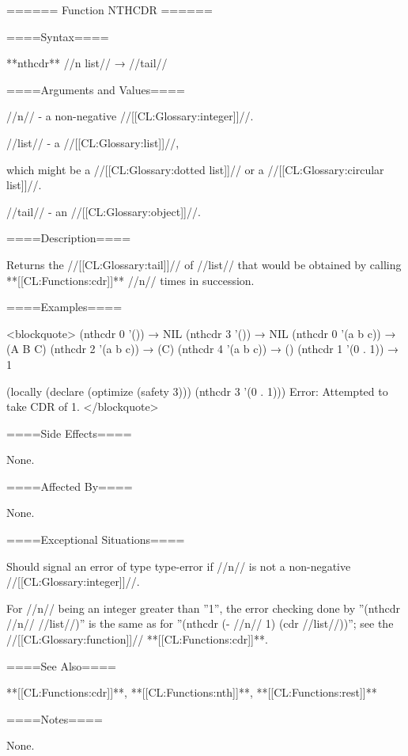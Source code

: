 ====== Function NTHCDR ======

====Syntax====

**nthcdr** //n list// → //tail//

====Arguments and Values====

//n// - a non-negative //[[CL:Glossary:integer]]//.

//list// - a //[[CL:Glossary:list]]//,

which might be a //[[CL:Glossary:dotted list]]// or a //[[CL:Glossary:circular list]]//.

//tail// - an //[[CL:Glossary:object]]//.

====Description====

Returns the //[[CL:Glossary:tail]]// of //list// that would be obtained by calling **[[CL:Functions:cdr]]** //n// times in succession.

====Examples====

<blockquote> (nthcdr 0 '()) → NIL (nthcdr 3 '()) → NIL (nthcdr 0 '(a b c)) → (A B C) (nthcdr 2 '(a b c)) → (C) (nthcdr 4 '(a b c)) → () (nthcdr 1 '(0 . 1)) → 1

(locally (declare (optimize (safety 3))) (nthcdr 3 '(0 . 1))) Error: Attempted to take CDR of 1. </blockquote>

====Side Effects====

None.

====Affected By====

None.

====Exceptional Situations====

Should signal an error of type type-error if //n// is not a non-negative //[[CL:Glossary:integer]]//.

For //n// being an integer greater than ''1'', the error checking done by ''(nthcdr //n// //list//)'' is the same as for ''(nthcdr (- //n// 1) (cdr //list//))''; see the //[[CL:Glossary:function]]// **[[CL:Functions:cdr]]**.

====See Also====

**[[CL:Functions:cdr]]**, **[[CL:Functions:nth]]**, **[[CL:Functions:rest]]**

====Notes====

None.

 

